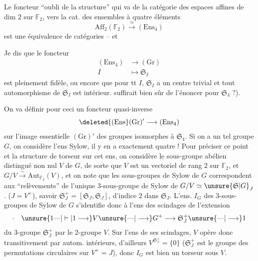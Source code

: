 Le foncteur ``oubli de la structure'' qui va de la  catégorie des espaces affines de dim $2$ sur $\mathbb{F}_2$, vers la cat. des ensembles à quatre éléments
\[
\mathrm{Aff}_2(\mathbb{F}_2)\xrightarrow{\approx}(\mathrm{Ens}_4)
\]
est une équivalence de catégories -- et 

Je dis que le foncteur
\[
\begin{aligned}
(\mathrm{Ens}_4)&\longrightarrow(\mathrm{Gr})\\
I&\longmapsto\mathfrak{S}_I
\end{aligned}
\]
est pleinement fidèle, ou encore que pour tt $I$, $\mathfrak{S}_I$ a  un centre trivial et tout automorphisme de $\mathfrak{S}_I$ est intérieur.   suffirait bien sûr de l'énoncer pour $\mathfrak{S}_4$ ?).

On va définir pour ceci un foncteur quasi-inverse
\[
\deleted{(\mathrm{Ens}}(\mathrm{Gr})'\longrightarrow(\mathrm{Ens}_4)
\]
sur l'image essentielle $(\mathrm{Gr})'$ des groupes isomorphes à $\mathfrak{S}_4$. Si on a un tel groupe $G$, on considère l'ens     Sylow, il y en a exactement quatre ! Pour préciser ce point et 
la structure de torseur sur cet ens, on considère le sous-groupe abélien distingué  non nul $V$ de $G$, de sorte que $V$  est un vectoriel de rang $2$ sur $\mathbb{F}_2$, et $G/V\xrightarrow{\sim}\mathrm{Aut}_{\mathbb{F}_2}(V)$, et on note que les sous-groupes de Sylow de $G$ correspondent aux ``relèvements'' de l'unique 3-sous-groupe de Sylow de $G/V\simeq\unsure{\mathfrak{S}|G}_J$. ($J=V^\times$), savoir $\mathfrak{S}_J^+=[\mathfrak{S}_J,\mathfrak{S}_J]$, d'indice $2$ dans $\mathfrak{S}_J$.  L'ens. $I_G$ des 3-sous-groupes de Sylow de $G$ s'identifie donc à l'ens des scindages de l'extension
\[
\cdot\quad\unsure{1\text{---}|\vdash|1\longrightarrow} V\unsure{\text{---}|\longrightarrow} G^+\longrightarrow\mathfrak{S}_J^+\unsure{\text{---}|\longrightarrow}1
\]
du 3-groupe $\mathfrak{S}_J^+$ par le 2-groupe $V$. Sur l'ens de ses scindages, $V$ opère donc transitivement par autom. intérieurs, d'ailleurs $V^{\mathfrak{S}_J^+}=\{0\}$ ($\mathfrak{S}_J^+$ est le groupe des permutations circulaires sur $V^\times=J$), donc $I_G$ est bien un torseur sous $V$.

